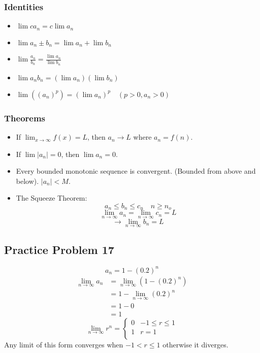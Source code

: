 \documentclass[letterpaper, 12pt]{article}
\begin{document}
\subsubsection*{Identities}
\begin{itemize}
  \item \( \lim{ca_{n}} = c\lim{a_{n}} \)
  \item \( \lim{a_{n} \pm b_{n}} = \lim{a_{n}}+\lim{b_{n}} \)
  \item \( \lim{\frac{a_{n}}{b_{n}}} = \frac{\lim{a_{n}}}{\lim{b_{n}}} \)
  \item \( \lim{a_{n}b_{n}} = (\lim{a_{n}})(\lim{b_{n}}) \)
  \item \( \lim{((a_{n})^{p})} = (\lim{a_{n}})^{p} \quad (p>0,a_{n}>0) \)
\end{itemize}

\subsubsection*{Theorems}
\begin{itemize}
  \item If \( \lim_{x \to \infty}{f(x)} = L \), then \( a_{n} \rightarrow L \)
    where \( a_{n} = f(n) \).
  \item If \( \lim{|a_{n}|} = 0\), then \( \lim{a_{n}} = 0 \).
  \item Every bounded monotonic sequence is convergent. (Bounded from above and
    below). \( |a_{n}| < M \).
  \item The Squeeze Theorem:
    \[ a_{n} \leq b_{n} \leq c_{n} \quad n \geq n_{o} \]
    \[ \lim_{n\to\infty}{a_{n}} = \lim_{n\to\infty}{c_{n}} = L \]
    \[ \rightarrow \lim_{n\to\infty}{b_{n}} = L \]
\end{itemize}

\subsection*{Practice Problem 17}
\[ a_{n} = 1-(0.2)^{n} \]
\begin{align*}
  \lim_{n\to\infty}{a_{n}} &= \lim_{n\to\infty}{(1-(0.2)^{n})} \\
  &= 1-\lim_{n\to\infty}{(0.2)^{n}} \\
  &= 1-0 \\
  &= 1
\end{align*}
\[
  \lim_{n\to\infty}{r^{n}} =
  \begin{cases}
      0 & -1 \leq r \leq 1 \\
      1 & r = 1 \\
   \end{cases}
\]
Any limit of this form converges when \( -1 < r \leq 1 \) otherwise it
diverges.
\end{document}
